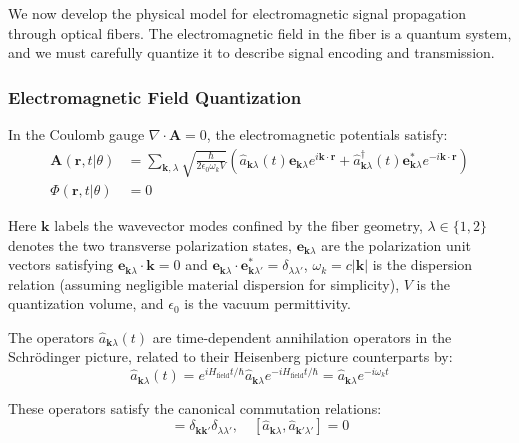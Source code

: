 \documentclass[12pt,a4paper]{article}
\begin{document}
We now develop the physical model for electromagnetic signal propagation through optical fibers. The electromagnetic field in the fiber is a quantum system, and we must carefully quantize it to describe signal encoding and transmission.

\subsubsection{Electromagnetic Field Quantization}

In the Coulomb gauge $\nabla \cdot \mathbf{A} = 0$, the electromagnetic potentials satisfy:
\begin{align}
\mathbf{A}(\mathbf{r}, t | \theta) &= \sum_{\mathbf{k}, \lambda} \sqrt{\frac{\hbar}{2\epsilon_0 \omega_k V}} \left(\hat{a}_{\mathbf{k}\lambda}(t) \mathbf{e}_{\mathbf{k}\lambda} e^{i\mathbf{k} \cdot \mathbf{r}} + \hat{a}_{\mathbf{k}\lambda}^\dagger(t) \mathbf{e}_{\mathbf{k}\lambda}^* e^{-i\mathbf{k} \cdot \mathbf{r}}\right) \\
\Phi(\mathbf{r}, t | \theta) &= 0
\end{align}

Here $\mathbf{k}$ labels the wavevector modes confined by the fiber geometry, $\lambda \in \{1,2\}$ denotes the two transverse polarization states, $\mathbf{e}_{\mathbf{k}\lambda}$ are the polarization unit vectors satisfying $\mathbf{e}_{\mathbf{k}\lambda} \cdot \mathbf{k} = 0$ and $\mathbf{e}_{\mathbf{k}\lambda} \cdot \mathbf{e}_{\mathbf{k}\lambda'}^* = \delta_{\lambda\lambda'}$, $\omega_k = c|\mathbf{k}|$ is the dispersion relation (assuming negligible material dispersion for simplicity), $V$ is the quantization volume, and $\epsilon_0$ is the vacuum permittivity.

The operators $\hat{a}_{\mathbf{k}\lambda}(t)$ are time-dependent annihilation operators in the Schrödinger picture, related to their Heisenberg picture counterparts by:
\begin{equation}
\hat{a}_{\mathbf{k}\lambda}(t) = e^{iH_{\text{field}}t/\hbar} \hat{a}_{\mathbf{k}\lambda} e^{-iH_{\text{field}}t/\hbar} = \hat{a}_{\mathbf{k}\lambda} e^{-i\omega_k t}
\end{equation}

These operators satisfy the canonical commutation relations:
\begin{equation}
[\hat{a}_{\mathbf{k}\lambda}, \hat{a}_{\mathbf{k}'\lambda'}^\dagger] = \delta_{\mathbf{k}\mathbf{k}'} \delta_{\lambda\lambda'}, \quad [\hat{a}_{\mathbf{k}\lambda}, \hat{a}_{\mathbf{k}'\lambda'}] = 0
\end{equation}
\end{document}
